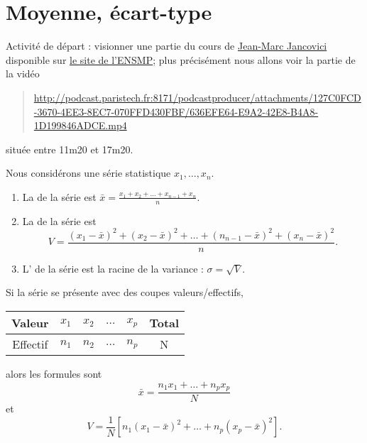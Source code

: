 
\section{Moyenne, écart-type}

Activité de départ : visionner une partie du cours de \href{http://www.manicore.com}{Jean-Marc Jancovici} disponible sur \href{http://podcast.paristech.fr/groups/mines/wiki/8f866/Energie_et_changement_climatique_de_JeanMarc_Jancovici.html}{le site de l'ENSMP}; plus précisément nous allons voir la partie de la vidéo
\begin{quote}
    \url{http://podcast.paristech.fr:8171/podcastproducer/attachments/127C0FCD-3670-4EE3-8EC7-070FFD430FBF/636EFE64-E9A2-42E8-B4A8-1D199846ADCE.mp4}
\end{quote}
située entre 11m20 et 17m20.

Nous considérons une série statistique \( x_1,\ldots, x_n\).
\begin{definition}
    \begin{enumerate}
        \item
    La  de la série est \( \bar x=\frac{ x_1+x_2+\ldots +x_{n-1}+x_n }{ n }\).
\item
    La  de la série est
    \begin{equation}
        V=\frac{ (x_1-\bar x)^2+(x_2-\bar x)^2+\ldots +(n_{n-1}-\bar x)^2+(x_n-\bar x)^2 }{ n }.
    \end{equation}
\item
    L' de la série est la racine de la variance : \( \sigma=\sqrt{V}\).
            
    \end{enumerate}

\end{definition}

Si la série se présente avec des coupes valeurs/effectifs, 
\begin{center}
\begin{tabular}[]{|c||c|c|c|c|c|}
    \hline
    Valeur&\( x_1\)&\( x_2\)&\( \ldots\)&\( x_p\)&Total\\
    \hline
    Effectif&\( n_1\)&\( n_2\)&\( \ldots\)&\( n_p\)&N\\
    \hline
\end{tabular}
\end{center}
alors les formules sont
\begin{equation}
    \bar x=\frac{ n_1x_1+\ldots +n_px_p }{ N }
\end{equation}
et
\begin{equation}
    V=\frac{1}{ N }\left[ n_1(x_1-\bar x)^2+\ldots +n_p(x_p-\bar x)^2 \right].
\end{equation}


